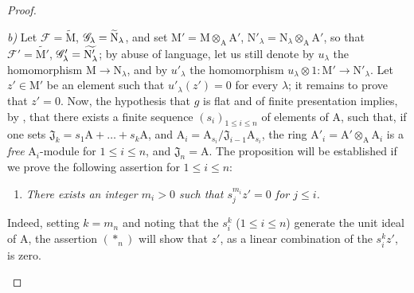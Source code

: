 \begin{proof}
\begin{enumerate}[label=(\roman*)]
  \emph{b)} Let $\mathscr{F}=\widetilde{\mathrm{M}}$, $\mathscr{G}_\lambda=\widetilde{\mathrm{N}}_\lambda$, and set $\mathrm{M}'=\mathrm{M}\otimes_\mathrm{A}\mathrm{A}'$, $\mathrm{N}'_\lambda=\mathrm{N}_\lambda\otimes_\mathrm{A}\mathrm{A}'$, so that $\mathscr{F}'=\widetilde{\mathrm{M}'}$, $\mathscr{G}'_\lambda=\widetilde{\mathrm{N}'_\lambda}$; by abuse of language, let us still denote by $u_\lambda$ the homomorphism $\mathrm{M}\to\mathrm{N}_\lambda$, and by $u'_\lambda$ the homomorphism $u_\lambda\otimes 1:\mathrm{M}'\to\mathrm{N}'_\lambda$.
  Let $z'\in\mathrm{M}'$ be an element such that $u'_\lambda(z')=0$ for every $\lambda$; it remains to prove that $z'=0$.
  Now, the hypothesis that $g$ is flat and of finite presentation implies, by , that there exists a finite sequence $(s_i)_{1\leq i\leq n}$ of elements of $\mathrm{A}$, such that, if one sets $\mathfrak{J}_k=s_1\mathrm{A}+\ldots+s_k\mathrm{A}$, and $\mathrm{A}_i=\mathrm{A}_{s_i}/\mathfrak{J}_{i-1}\mathrm{A}_{s_i}$, the ring $\mathrm{A}'_i=\mathrm{A}'\otimes_\mathrm{A}\mathrm{A}_i$ is a \emph{free} $\mathrm{A}_i$-module for $1\leq i\leq n$, and $\mathfrak{J}_n=\mathrm{A}$.
  The proposition will be established if we prove the following assertion for $1\leq i\leq n$:
  \begin{enumerate}[label=$(*_i)$]
    \item \emph{There exists an integer $m_i>0$ such that $s_j^{m_i}z'=0$ for $j\leq i$.}
  \end{enumerate}
  Indeed, setting $k=m_n$ and noting that the $s_i^k$ ($1\leq i\leq n$) generate the unit ideal of $\mathrm{A}$, the assertion $(*_n)$ will show that $z'$, as a linear combination of the $s_i^k z'$, is zero.


\end{enumerate}
\end{proof}
